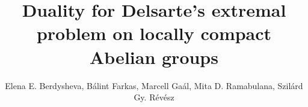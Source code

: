 \documentclass[[a4paper,english,12pt]{amsart}
\theoremstyle{plain}
\theoremstyle{remark}
\begin{document}
\title[Duality for Delsarte's extremal problem on LCA groups]{Duality for Delsarte's extremal problem on locally compact Abelian groups}

\author[Berdysheva et al.]{Elena E. Berdysheva, B\'alint Farkas, Marcell Ga\'al, Mita D. Ramabulana, Szil\'ard Gy. R\'ev\'esz}


\address{Elena E. Berdysheva
\newline  \indent University of Cape Town,
\newline  \indent South Africa}



\address{B\'alint Farkas
\newline  \indent University of Wuppertal
\newline  \indent Gau{\ss}stra{\ss}e 20, 42119 Wuppertal, Germany}



\address{Mita D. Ramabulana
\newline  \indent University of Cape Town,
\newline  \indent South Africa}



\address{Szil\'ard Gy. R\'evesz
\newline  \indent HUN-REN R\'enyi Institute of Mathematics,
\newline \indent Budapest, Re\'altanoda utca 13-15,1053 HUNGARY}



\end{document}
